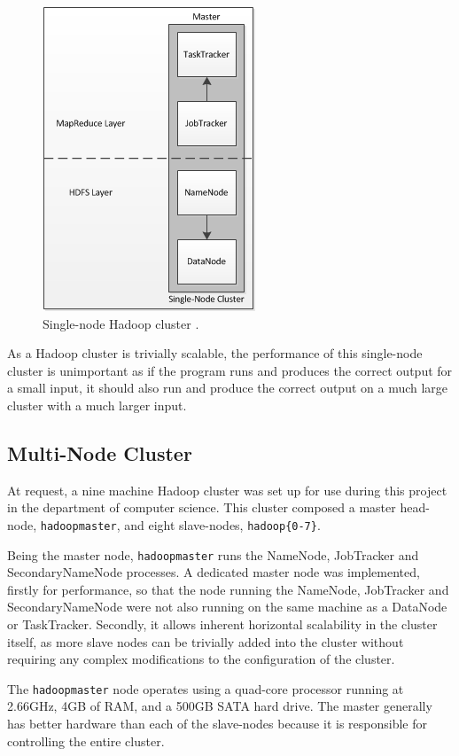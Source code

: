 \begin{figure}[htbp]
  \centering
    \includegraphics{./img/singlenode}
  \caption{Single-node Hadoop cluster \cite{nollsingle}.}
  \label{fig:singlenode}
\end{figure}

As a Hadoop cluster is trivially scalable, the performance of this single-node cluster is unimportant as if the program runs and produces the correct output for a small input, it should also run and produce the correct output on a much large cluster with a much larger input.

\subsection{Multi-Node Cluster}
At request, a nine machine Hadoop cluster was set up for use during this project in the department of computer science. This cluster composed a master head-node, {\tt hadoopmaster}, and eight slave-nodes, {\tt hadoop\{0-7\}}. 

Being the master node, {\tt hadoopmaster} runs the NameNode, JobTracker and SecondaryNameNode processes. A dedicated master node was implemented, firstly for performance, so that the node running the NameNode, JobTracker and SecondaryNameNode were not also running on the same machine as a DataNode or TaskTracker. Secondly, it allows inherent horizontal scalability in the cluster itself, as more slave nodes can be trivially added into the cluster without requiring any complex modifications to the configuration of the cluster. 

The {\tt hadoopmaster} node operates using a quad-core processor running at 2.66GHz, 4GB of RAM, and a 500GB SATA hard drive. The master generally has better hardware than each of the slave-nodes because it is responsible for controlling the entire cluster.

